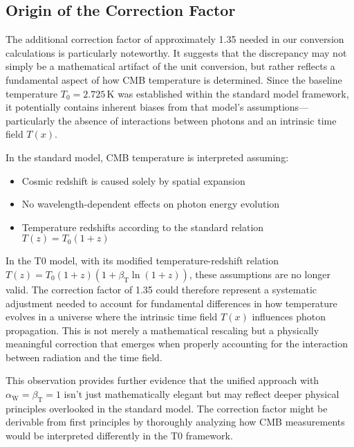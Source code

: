 \documentclass[12pt,a4paper]{article}
\newcommand{\Tfield}{T(x)}
\newcommand{\betaT}{\beta_{\text{T}}}
\newcommand{\alphaW}{\alpha_{\text{W}}}
\begin{document}
\begin{enumerate}
		\subsection{Origin of the Correction Factor}
		
		The additional correction factor of approximately 1.35 needed in our conversion calculations is particularly noteworthy. It suggests that the discrepancy may not simply be a mathematical artifact of the unit conversion, but rather reflects a fundamental aspect of how CMB temperature is determined. Since the baseline temperature \(T_0 = 2.725 \, \text{K}\) was established within the standard model framework, it potentially contains inherent biases from that model's assumptions—particularly the absence of interactions between photons and an intrinsic time field \(\Tfield\).
		
		In the standard model, CMB temperature is interpreted assuming:
		\begin{itemize}
			\item Cosmic redshift is caused solely by spatial expansion
			\item No wavelength-dependent effects on photon energy evolution
			\item Temperature redshifts according to the standard relation \(T(z) = T_0(1+z)\)
		\end{itemize}
		
		In the T0 model, with its modified temperature-redshift relation \(T(z) = T_0(1+z)(1+\betaT\ln(1+z))\), these assumptions are no longer valid. The correction factor of 1.35 could therefore represent a systematic adjustment needed to account for fundamental differences in how temperature evolves in a universe where the intrinsic time field \(\Tfield\) influences photon propagation. This is not merely a mathematical rescaling but a physically meaningful correction that emerges when properly accounting for the interaction between radiation and the time field.
		
		This observation provides further evidence that the unified approach with \(\alphaW = \betaT = 1\) isn't just mathematically elegant but may reflect deeper physical principles overlooked in the standard model. The correction factor might be derivable from first principles by thoroughly analyzing how CMB measurements would be interpreted differently in the T0 framework.
		
	\end{enumerate}
	

	
\end{document}
